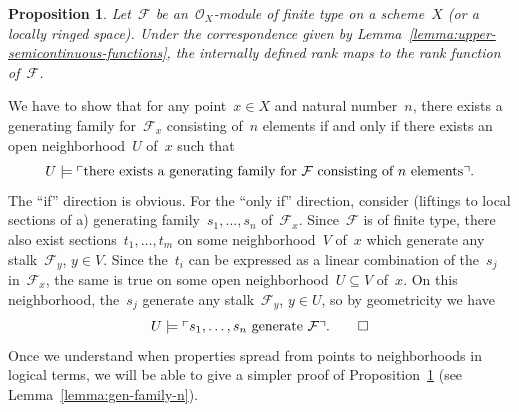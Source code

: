 \documentclass[10pt,reqno,a4paper]{amsbook}
\makeatletter
\theoremstyle{definition}
\theoremstyle{plain}
\newtheorem{prop}[defn]{Proposition}
\theoremstyle{remark}
\newcommand{\F}{\mathcal{F}}
\renewcommand{\O}{\mathcal{O}}
\newcommand{\?}{\,{:}\,}
\renewcommand{\_}{\mathpunct{.}\,}
\newcommand{\speak}[1]{\ulcorner\text{\textnormal{#1}}\urcorner}
\renewenvironment{proof}[1][\proofname]{\par
  \pushQED{\qed}%
  \normalfont \topsep6\p@\@plus6\p@\relax
  \trivlist
  \item[\hskip\labelsep
        \itshape
    #1\@addpunct{.}]\ignorespaces
}{%
  \popQED\endtrivlist\@endpefalse
}
\makeatother
\begin{document}
\begin{prop}\label{prop:rank-function-internally}
Let~$\F$ be an~$\O_X$-module of finite type on a scheme~$X$ (or a locally ringed
space). Under the correspondence given by Lemma~\ref{lemma:upper-semicontinuous-functions}, the internally
defined rank maps to the rank function of~$\F$.
\end{prop}
\begin{proof}
We have to show that for any point~$x \in X$ and natural number~$n$, there
exists a generating family for~$\F_x$ consisting of~$n$
elements if and only if there exists an open neighborhood~$U$ of~$x$ such that
\[ U \models \speak{there exists a generating family
for~$\F$ consisting of~$n$ elements}. \]
The ``if'' direction is obvious. For the ``only if'' direction, consider
(liftings to local sections of a)
generating family~$s_1,\ldots,s_n$ of~$\F_x$. Since~$\F$ is of finite type,
there also exist sections~$t_1,\ldots,t_m$ on some neighborhood~$V$ of~$x$ which
generate any stalk~$\F_y$, $y \in V$. Since the~$t_i$ can be expressed as a
linear combination of the~$s_j$ in~$\F_x$, the same is true on some open
neighborhood~$U \subseteq V$ of~$x$. On this neighborhood, the~$s_j$ generate
any stalk~$\F_y$, $y \in U$, so by geometricity we have
\[ U \models \speak{$s_1,\ldots,s_n$ generate~$\F$}. \qedhere \]
\end{proof}
Once we understand when properties spread from points to
neighborhoods in logical terms, we will be able to give a simpler proof of Proposition~\ref{prop:rank-function-internally} (see
Lemma~\ref{lemma:gen-family-n}).
\end{document}
